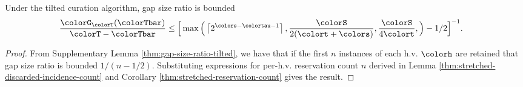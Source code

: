 \begin{theorem}
\label{thm:tilted-gap-size}
Under the tilted curation algorithm, gap size ratio is bounded
\begin{align*}
  \frac{\colorG_{\colorT}(\colorTbar)}{\colorT - \colorTbar}
  &\leq
  \Big[
    \max\Big(
      \left\lceil 2^{\colors - \colortau - 1} \right\rceil,
      \frac{\colorS}{2(\colort + \colors)},
      \frac{\colorS}{4\colort},
    \Big)
    - 1/2
  \Big]^{-1}.
\end{align*}
\end{theorem}
\begin{proof}

From Supplementary Lemma \ref{thm:gap-size-ratio-tilted}, we have that if the first $n$ instances of each h.v. $\colorh$ are retained that gap size ratio is bounded $1/(n - 1/2)$.
Substituting expressions for per-h.v. reservation count $n$ derived in Lemma \ref{thm:stretched-discarded-incidence-count} and Corollary \ref{thm:stretched-reservation-count} gives the result.
\end{proof}

